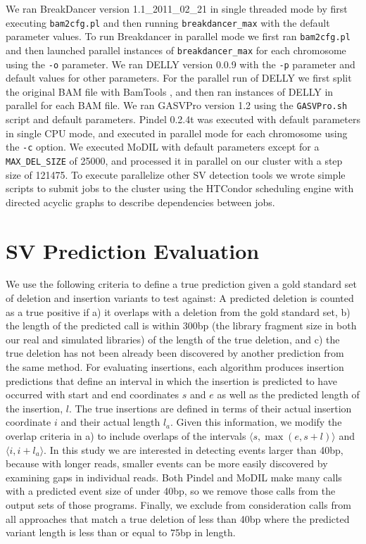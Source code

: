 We ran BreakDancer version 1.1\_2011\_02\_21 in single threaded mode by first executing \texttt{bam2cfg.pl} and then running \texttt{breakdancer\_max} with the default parameter values.  To run Breakdancer in parallel mode we first ran \texttt{bam2cfg.pl} and then launched parallel instances of \texttt{breakdancer\_max} for each chromosome using the \texttt{-o} parameter. We ran DELLY version 0.0.9 with the \texttt{-p} parameter and default values for other parameters. For the parallel run of DELLY we first split the original BAM file with BamTools \cite{Barnett:2011hm}, and then ran instances of DELLY in parallel for each BAM file. We ran GASVPro version 1.2 using the \texttt{GASVPro.sh} script and default parameters. Pindel 0.2.4t was executed with default parameters in single CPU mode, and executed in parallel mode for each chromosome using the \texttt{-c} option. We executed MoDIL with default parameters except for a \texttt{MAX\_DEL\_SIZE} of 25000, and processed it in parallel on our cluster with a step size of 121475. To execute parallelize other SV detection tools we wrote simple scripts to submit jobs to the cluster using the HTCondor scheduling engine \cite{condor-practice} with directed acyclic graphs to describe dependencies between jobs. 

\section{SV Prediction Evaluation}\label{section_prediction_evaluation}

We use the following criteria to define a true prediction given a gold standard set of deletion and insertion variants to test against: A predicted deletion is counted as a true positive if a) it overlaps with a deletion from the gold standard set, b) the length of the predicted call is within 300bp (the library fragment size in both our real and simulated libraries) of the length of the true deletion, and c) the true deletion has not been already been discovered by another prediction from the same method. For evaluating insertions, each algorithm produces insertion predictions that define an interval in which the insertion is predicted to have occurred with start and end coordinates $s$ and $e$ as well as the predicted length of the insertion, $l$. The true insertions are defined in terms of their actual insertion coordinate $i$ and their actual length $l_a$. Given this information, we modify the overlap criteria in a) to include overlaps of the intervals $\langle s,\max{\left(e,s+l\right)} \rangle$ and $\langle i,i+l_a \rangle$. In this study we are interested in detecting events larger than 40bp, because with longer reads, smaller events can be more easily discovered by examining gaps in individual reads. Both Pindel and MoDIL make many calls with a predicted event size of under 40bp, so we remove those calls from the output sets of those programs. Finally, we exclude from consideration calls from all approaches that match a true deletion of less than 40bp where the predicted variant length is less than or equal to 75bp in length.


